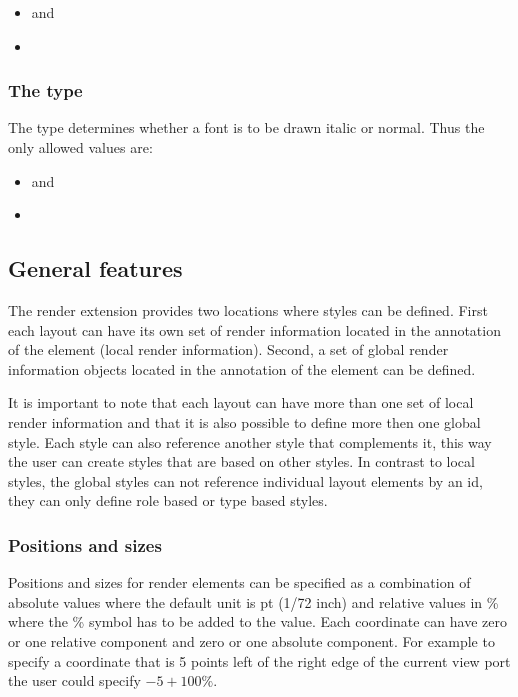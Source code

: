 \begin{itemize}
 \item {} and
 \item {} 
\end{itemize}

\subsubsection{The  type}
\label{fontstyle-type}
The type  determines whether a font is to be
drawn italic or normal. Thus the only allowed values are:

\begin{itemize}
 \item {} and
 \item {} 
\end{itemize}

\subsection{General features}

The render extension provides two locations where styles can be defined. First 
each layout can have its own set of render information located in the 
annotation of the \Layout element (local render information). 
Second, a set of global render information objects 
located in the annotation of the \ListOfLayouts element can be defined. 

It is important to note that each layout can have more than one 
set of local render information and that it is 
also possible to define more then one global style. Each style can also 
reference another style that complements it, this way the user can create 
styles that are based on other styles. In contrast to local styles, the global styles can not 
reference individual layout elements by an id, they can only define role based or 
type based styles.

\subsubsection{Positions and sizes}

Positions and sizes for render elements can be specified as a combination of absolute 
values where the default unit is pt (1/72 inch) 
and relative values in \% where the \% symbol has to be added to 
the value. Each coordinate can have zero or one relative component and zero or one absolute component.
For example to specify a coordinate that is 5 points left of the right edge of the current view port the
user could specify $-5+100\%$. 

